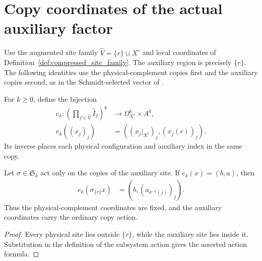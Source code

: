 \section{Copy coordinates of the actual auxiliary factor}
\label{sec:compressed_typical_auxiliary_coordinates}

Use the augmented site family $\widehat V=\{r\}\sqcup X^c$ and local
coordinates of Definition~\ref{def:compressed_site_family}. The
auxiliary region is precisely $\{r\}$. The following identities use the
physical-complement copies first and the auxiliary copies second, as in
the Schmidt-selected vector of \cite[Section~7]{OpenAI2026AreaLaw}.

\begin{definition}
\label{def:compressed_exterior_copy_coordinates}
\leanok
{}
For $k\ge0$, define the bijection
\begin{align}
 e_k:\left(\prod_{f\in\widehat V}\widehat I_f\right)^k
  &\longrightarrow\Omega_{X^c}^k\times A^k,\\
 e_k((x_j)_j)&=((x_j|_{X^c})_j,(x_j(r))_j).
\end{align}
Its inverse places each physical configuration and auxiliary index in the
same copy.
\end{definition}

\begin{theorem}
\label{thm:compressed_auxiliary_copy_action}
\leanok
{}
Let $\sigma\in\mathfrak S_k$ act only on the copies of the auxiliary
site. If $e_k(x)=(b,a)$, then
\begin{align}
 e_k(\sigma_{\{r\}}x)&=(b,(a_{\sigma^{-1}(j)})_j).
\end{align}
Thus the physical-complement coordinates are fixed, and the auxiliary
coordinates carry the ordinary copy action.
\end{theorem}
\begin{proof}
\leanok
Every physical site lies outside $\{r\}$, while the auxiliary site lies
inside it. Substitution in the definition of the subsystem action gives
the asserted action formula.
\end{proof}

